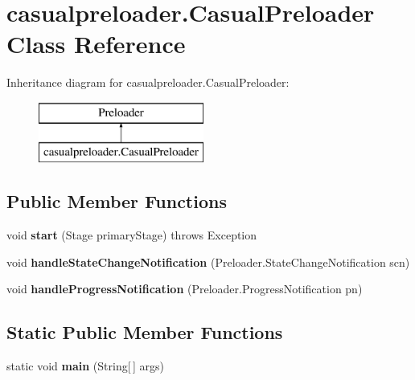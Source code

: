 \hypertarget{classcasualpreloader_1_1_casual_preloader}{\section{casualpreloader.\-Casual\-Preloader Class Reference}
\label{classcasualpreloader_1_1_casual_preloader}
}
Inheritance diagram for casualpreloader.\-Casual\-Preloader\-:\begin{figure}[H]
\begin{center}
\leavevmode
\includegraphics[height=2.000000cm]{classcasualpreloader_1_1_casual_preloader}
\end{center}
\end{figure}
\subsection*{Public Member Functions}
\begin{DoxyCompactItemize}
\item 
\hypertarget{classcasualpreloader_1_1_casual_preloader_a195beb725661b3aa9d75c1b32b6c9641}{void {\bfseries start} (Stage primary\-Stage)  throws Exception }\label{classcasualpreloader_1_1_casual_preloader_a195beb725661b3aa9d75c1b32b6c9641}

\item 
\hypertarget{classcasualpreloader_1_1_casual_preloader_af896a7fb568a6e75f31ff9a617dfe1bf}{void {\bfseries handle\-State\-Change\-Notification} (Preloader.\-State\-Change\-Notification scn)}\label{classcasualpreloader_1_1_casual_preloader_af896a7fb568a6e75f31ff9a617dfe1bf}

\item 
\hypertarget{classcasualpreloader_1_1_casual_preloader_aecc9199ce060c7abe366a3f21460c4fc}{void {\bfseries handle\-Progress\-Notification} (Preloader.\-Progress\-Notification pn)}\label{classcasualpreloader_1_1_casual_preloader_aecc9199ce060c7abe366a3f21460c4fc}

\end{DoxyCompactItemize}
\subsection*{Static Public Member Functions}
\begin{DoxyCompactItemize}
\item 
\hypertarget{classcasualpreloader_1_1_casual_preloader_a43ca0a5b3a18eae44a4742aecb4a1172}{static void {\bfseries main} (String\mbox{[}$\,$\mbox{]} args)}\label{classcasualpreloader_1_1_casual_preloader_a43ca0a5b3a18eae44a4742aecb4a1172}

\end{DoxyCompactItemize}


